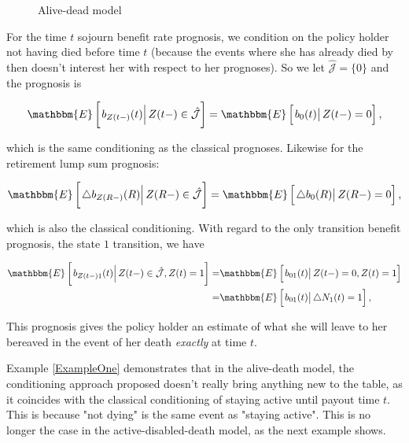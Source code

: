 \documentclass{book}
\newcommand{\1}[1]{\mathbbm{1}_{\left\lbrace #1 \right\rbrace}}
\newcommand{\econd}[2][def]{\mathbbm{E} \left[ \left. #1 \right| #2 \right]}
\theoremstyle{break}
\theoremstyle{remark}
\numberwithin{equation}{section}
\begin{document}
\begin{example}
\begin{figure}[H]
\begin{center}
		\caption{Alive-dead model}
	\end{center}
\end{figure}

For the time $t$ sojourn benefit rate prognosis, we condition on the policy holder not having died before time $t$ (because the events where she has already died by then doesn't interest her with respect to her prognoses). So we let $\hat{\mathcal{J}} = \{ 0 \}$ and the prognosis is

\begin{align*}
    \econd[b_{Z(t-)}(t)]{Z(t-) \in \hat{\mathcal{J}}} = \econd[b_0(t)]{Z(t-) = 0},
\end{align*}

which is the same conditioning as the classical prognoses. Likewise for the retirement lump sum prognosis:

\begin{align*}
    \econd[\triangle b_{Z(R-)}(R)]{Z(R-) \in \hat{\mathcal{J}}} = \econd[\triangle b_0(R)]{Z(R-) = 0},
\end{align*}

which is also the classical conditioning. With regard to the only transition benefit prognosis, the state $1$ transition, we have

\begin{align*}
\econd[b_{Z(t-)1}(t)]{Z(t-) \in \hat{\mathcal{J}}, Z(t)=1} =& \econd[b_{01}(t)]{Z(t-)=0, Z(t)=1} \\
=& \econd[b_{01}(t)]{\triangle N_1(t) = 1},
\end{align*}

This prognosis gives the policy holder an estimate of what she will leave to her bereaved in the event of her death \textit{exactly} at time $t$.
\end{example}

Example \ref{ExampleOne} demonstrates that in the alive-death model, the conditioning approach proposed doesn't really bring anything new to the table, as it coincides with the classical conditioning of staying active until payout time $t$. This is because "not dying" is the same event as "staying active". This is no longer the case in the active-disabled-death model, as the next example shows.
\end{document}
